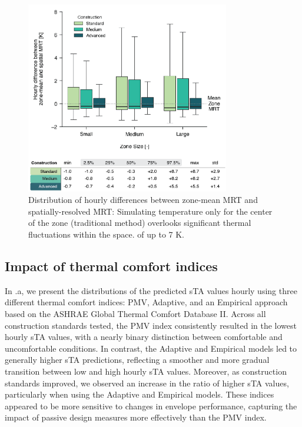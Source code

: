 \begin{figure}[H]
    \centering
    \includegraphics[width=8.9cm]{manuscript/src/figures/zone-mean-v-spatial.png}
    \caption{Distribution of hourly differences between zone-mean MRT and spatially-resolved MRT: Simulating temperature only for the center of the zone (traditional method) overlooks significant thermal fluctuations within the space. of up to 7 K.}
    \label{fig:zone-mean-v-spatial}
\end{figure}


\subsection{Impact of thermal comfort indices}

In .a, we present the distributions of the predicted sTA values hourly using three different thermal comfort indices: PMV, Adaptive, and an Empirical approach based on the ASHRAE Global Thermal Comfort Database II. Across all construction standards tested, the PMV index consistently resulted in the lowest hourly sTA values, with a nearly binary distinction between comfortable and uncomfortable conditions. In contrast, the Adaptive and Empirical models led to generally higher sTA predictions, reflecting a smoother and more gradual transition between low and high hourly sTA values. Moreover, as construction standards improved, we observed an increase in the ratio of higher sTA values, particularly when using the Adaptive and Empirical models. These indices appeared to be more sensitive to changes in envelope performance, capturing the impact of passive design measures more effectively than the PMV index.

